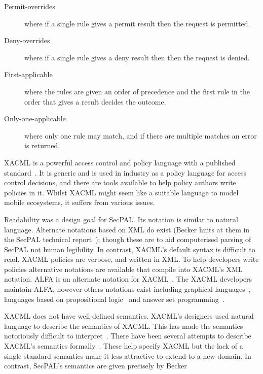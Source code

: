 \documentclass[thesis.tex]{subfiles}
\begin{document}
\begin{description}
  \item[Permit-overrides] where if a single rule gives a permit result then the request is permitted.
  \item[Deny-overrides] where if a single rule gives a deny result then then the request is denied.
  \item[First-applicable] where the rules are given an order of precedence and the first rule in the order that gives a result decides the outcome.
  \item[Only-one-applicable] where only one rule may match, and if there are multiple matches an error is returned.
\end{description}

XACML is a powerful access control and policy language with a published
standard~\cite{oasis_extensible_2013}. It is generic and is used in industry as
a policy language for access control decisions, and there are tools available to
help policy authors write policies in it. Whilst XACML might seem like a
suitable language to model mobile ecosystems, it suffers from various issues.

Readability was a design goal for SecPAL. Its notation is similar to natural
language. Alternate notations based on XML do exist (Becker hints at them in the
SecPAL technical report~\cite{becker_secpal:_2010}); though these are to aid
computerised parsing of SecPAL not human legibility. In contrast, XACML's
default syntax is difficult to read. XACML policies are verbose, and written in
XML. To help developers write policies alternative notations are available that
compile into XACML's XML notation. ALFA is an alternate notation for
XACML~\cite{oasis_xacml_technical_comitee_abbreviated_2015}. The XACML
developers maintain ALFA, however others notations exist including graphical
languages~\cite{henrik_nergaard_scratch-based_2015}, languages based on
propositional logic~\cite{zhang_synthesising_2004} and answer set
programming~\cite{ramli_xacml_2012}.

XACML does not have well-defined semantics. XACML's designers used natural
language to describe the semantics of XACML. This has made the semantics
notoriously difficult to interpret~\cite{ramli_detecting_2015}. There have been
several attempts to describe XACML's semantics
formally~\cite{ramli_xacml_2012,ramli_logic_2014,bryans_reasoning_2005}. These
help specify XACML but the lack of a single standard semantics make it less
attractive to extend to a new domain. In contrast, SecPAL's semantics are given
precisely by Becker~\cite{becker_secpal:_2010}
\end{document}
